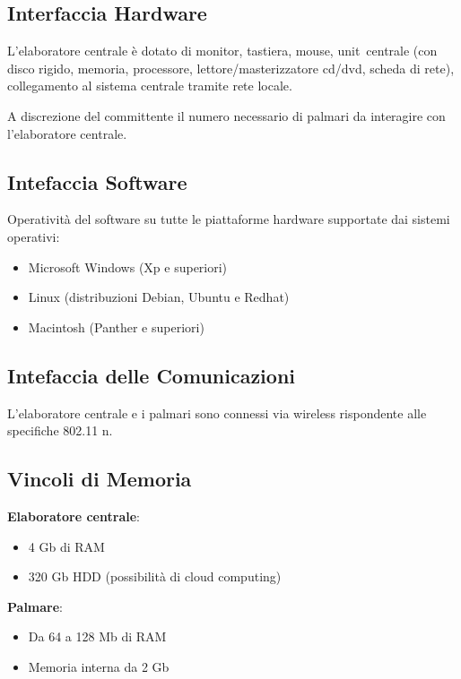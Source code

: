 \subsection{Interfaccia Hardware}

L'elaboratore centrale \`e dotato di monitor, tastiera, mouse, unit\ centrale 
(con disco rigido, memoria, processore, lettore/masterizzatore cd/dvd, scheda di rete), 
collegamento al sistema centrale tramite rete locale.

A discrezione del committente il numero necessario di palmari da interagire con 
l'elaboratore centrale.

\subsection{Intefaccia Software}

Operativit\`a del software su tutte le piattaforme hardware supportate dai sistemi operativi: 
\begin{itemize}
    \item Microsoft Windows (Xp e superiori) 
    \item Linux (distribuzioni Debian, Ubuntu e Redhat) 
    \item Macintosh (Panther e superiori)
\end{itemize}

\subsection{Intefaccia delle Comunicazioni}

L'elaboratore centrale e i palmari sono connessi via wireless rispondente alle specifiche 802.11 n.

\subsection{Vincoli di Memoria}

{\bf Elaboratore centrale}:
\begin{itemize}
    \item 4 Gb di RAM
    \item 320 Gb HDD (possibilit\`a di cloud computing)
\end{itemize}
{\bf Palmare}:
\begin{itemize}
    \item Da 64 a 128 Mb di RAM
    \item Memoria interna da 2 Gb
\end{itemize}

